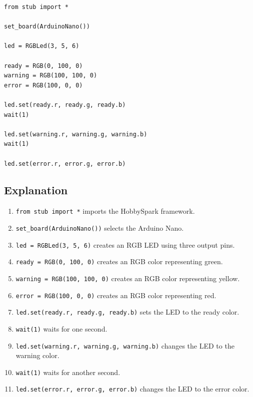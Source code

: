 \begin{lstlisting}
from stub import *

set_board(ArduinoNano())

led = RGBLed(3, 5, 6)

ready = RGB(0, 100, 0)
warning = RGB(100, 100, 0)
error = RGB(100, 0, 0)

led.set(ready.r, ready.g, ready.b)
wait(1)

led.set(warning.r, warning.g, warning.b)
wait(1)

led.set(error.r, error.g, error.b)
\end{lstlisting}

\subsection{Explanation}

\begin{enumerate}
    \item \texttt{from stub import *} imports the HobbySpark framework.

    \item \texttt{set\_board(ArduinoNano())} selects the Arduino Nano.

    \item \texttt{led = RGBLed(3, 5, 6)} creates an RGB LED using three
    output pins.

    \item \texttt{ready = RGB(0, 100, 0)} creates an RGB color representing
    green.

    \item \texttt{warning = RGB(100, 100, 0)} creates an RGB color
    representing yellow.

    \item \texttt{error = RGB(100, 0, 0)} creates an RGB color representing
    red.

    \item \texttt{led.set(ready.r, ready.g, ready.b)} sets the LED to the
    ready color.

    \item \texttt{wait(1)} waits for one second.

    \item \texttt{led.set(warning.r, warning.g, warning.b)} changes the LED
    to the warning color.

    \item \texttt{wait(1)} waits for another second.

    \item \texttt{led.set(error.r, error.g, error.b)} changes the LED to the
    error color.
\end{enumerate}


